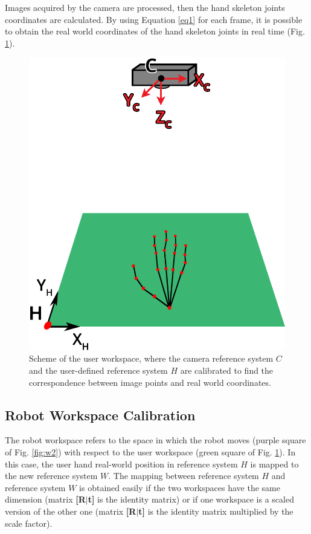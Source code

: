 \documentclass[letterpaper, 10 pt, conference]{ieeeconf}  %
\begin{document}
Images acquired by the camera are processed, then the hand skeleton joints coordinates are calculated. By using Equation \ref{eq1} for each frame, it is possible to obtain the real world coordinates of the hand skeleton joints in real time (Fig. \ref{fig:w1}).

\begin{figure} [h!]
  \centering
  \includegraphics[width=0.6\columnwidth]{figures/w1.png}
  \caption{Scheme of the user workspace, where the camera reference system $C$ and the user-defined reference system $H$ are calibrated to find the correspondence between image points and real world coordinates.}
  \label{fig:w1}
\end{figure}


\subsection{Robot Workspace Calibration}
The robot workspace refers to the space in which the robot moves (purple square of Fig. \ref{fig:w2}) with respect to the user workspace (green square of Fig. \ref{fig:w1}). In this case, the user hand real-world position in reference system $H$ is mapped to the new reference system $W$. The mapping between reference system $H$ and reference system $W$ is obtained easily if the two workspaces have the same dimension (matrix \textbf{[R$|$t]} is the identity matrix) or if one workspace is a scaled version of the other one (matrix \textbf{[R$|$t]} is the identity matrix multiplied by the scale factor). %
\end{document}
